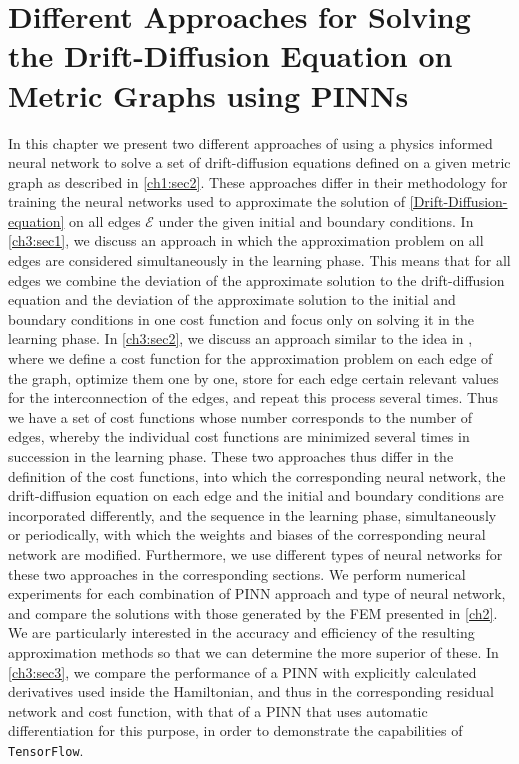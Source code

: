 \chapter{Different Approaches for Solving the Drift-Diffusion Equation on Metric Graphs using PINNs}

In this chapter we present two different approaches of using a physics informed neural network to solve a set of drift-diffusion equations defined on a given metric graph as described in \cref{ch1:sec2}. These approaches differ in their methodology for training the neural networks used to approximate the solution of \cref{Drift-Diffusion-equation} on all edges $\mathcal{E}$ under the given initial and boundary conditions. In \cref{ch3:sec1}, we discuss an approach in which the approximation problem on all edges are considered simultaneously in the learning phase. This means that for all edges we combine the deviation of the approximate solution to the drift-diffusion equation and the deviation of the approximate solution to the initial and boundary conditions in one cost function and focus only on solving it in the learning phase. In \cref{ch3:sec2}, we discuss an approach similar to the idea in \cite{JagtapKharazmiKarniadakis:2020}, where we define a cost function for the approximation problem on each edge of the graph, optimize them one by one, store for each edge certain relevant values for the interconnection of the edges, and repeat this process several times. Thus we have a set of cost functions whose number corresponds to the number of edges, whereby the individual cost functions are minimized several times in succession in the learning phase. These two approaches thus differ in the definition of the cost functions, into which the corresponding neural network, the drift-diffusion equation on each edge and the initial and boundary conditions are incorporated differently, and the sequence in the learning phase, simultaneously or periodically, with which the weights and biases of the corresponding neural network are modified. Furthermore, we use different types of neural networks for these two approaches in the corresponding sections. We perform numerical experiments for each combination of PINN approach and type of neural network, and compare the solutions with those generated by the FEM presented in \cref{ch2}. We are particularly interested in the accuracy and efficiency of the resulting approximation methods so that we can determine the more superior of these. In \cref{ch3:sec3}, we compare the performance of a PINN with explicitly calculated derivatives used inside the Hamiltonian, and thus in the corresponding residual network and cost function, with that of a PINN that uses automatic differentiation for this purpose, in order to demonstrate the capabilities of \lstinline!TensorFlow!. \\

